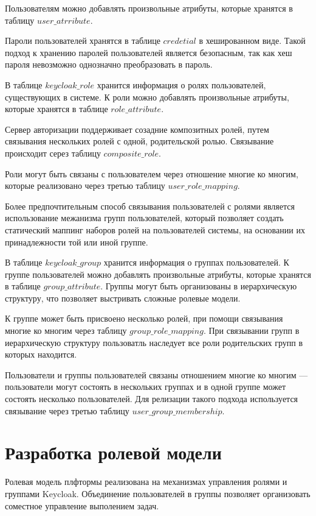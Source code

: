 Пользователям можно добавлять произвольные атрибуты, которые хранятся в таблицу $user\_atrribute$.

Пароли пользователей хранятся в таблице $credetial$ в хешированном виде. Такой подход к хранению паролей пользователей является безопасным, так как хеш пароля невозможно однозначно преобразовать в пароль.

В таблице $keycloak\_role$ хранится информация о ролях пользователей, существующих в системе. К роли  можно добавлять произвольные атрибуты, которые хранятся в таблице $role\_attribute$.

Сервер авторизации поддерживает созадние композитных ролей, путем связывания нескольких ролей с одной, родительской ролью. Связывание происходит серез таблицу $composite\_role$.

Роли могут быть связаны с пользователем через отношение многие ко многим, которые реализовано через третью таблицу $user\_role\_mapping$.

Более предпочтительным способ связывания пользователей с ролями является использование межанизма групп пользователей, который позволяет создать статический маппинг наборов ролей на пользователей системы, на основании их принадлежности той или иной группе.

В таблице $keycloak\_group$ хранится информация о группах пользователей. К группе пользователей можно добавлять произвольные атрибуты, которые хранятся в таблице $group\_attribute$. Группы могут быть организованы в иерархическую структуру, что позволяет выстривать сложные ролевые модели.

К группе может быть присвоено несколько ролей, при помощи связывания многие ко многим через таблицу $group\_role\_mapping$. При связывании групп в иерархическую структуру пользоватль наследует все роли родительских групп в которых находится.

Пользователи и группы пользователей связаны отношением многие ко многим --- пользователи могут состоять в нескольких группах и в одной группе может состоять несколько пользователей. Для релизации такого подхода используется связывание через третью таблицу $user\_group\_membership$.

\section{Разработка ролевой модели}

Ролевая модель плфтормы реализована на механизмах управления ролями и группами Keycloak. Объединение пользователей в группы позволяет организовать соместное управление выполением задач.


